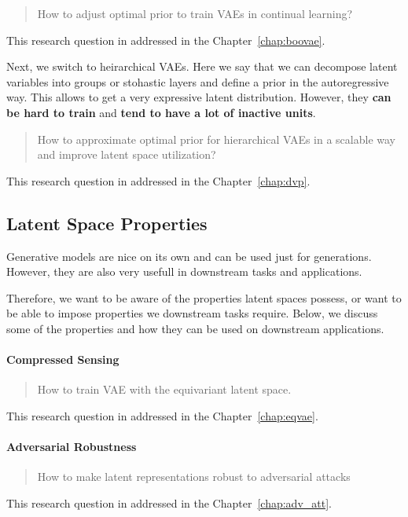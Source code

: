 \begin{quote}
	How  to adjust optimal prior to train VAEs in continual learning?
\end{quote}
This research question in addressed in the Chapter~\ref{chap:boovae}.


Next, we switch to heirarchical VAEs. Here we say that we can decompose latent variables into groups or stohastic layers and define a prior in the autoregressive way. This allows to get a very expressive latent distribution. However, they \textbf{can be hard to train} and \textbf{tend to have a lot of inactive units}.


\begin{quote}
	How  to approximate optimal prior for hierarchical VAEs in a scalable way and improve latent space utilization?
\end{quote}
This research question in addressed in the Chapter~\ref{chap:dvp}.


\subsection{Latent Space Properties}
Generative models are nice on its own and can be used just for generations. However, they are also very usefull in downstream tasks and applications. 

Therefore, we want to be aware of the properties latent spaces possess, or want to be able to impose properties we downstream tasks require. Below, we  discuss some of the properties and how they can be used on downstream applications.

\paragraph{Compressed Sensing}
\begin{quote}
	How  to train VAE with the equivariant latent space.
\end{quote}
This research question in addressed in the Chapter~\ref{chap:eqvae}.

\paragraph{Adversarial Robustness}
\begin{quote}
	How  to make latent representations robust to adversarial attacks
\end{quote}
This research question in addressed in the Chapter~\ref{chap:adv_att}.

